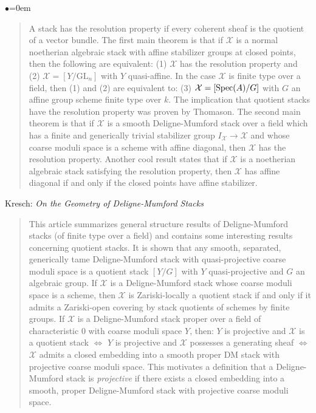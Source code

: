 \begin{list}{$\bullet$}{\leftmargin=0em}
\begin{quote}
A stack has the resolution property if every coherent sheaf is the quotient of 
a vector bundle. The first main theorem is that if $\mathcal{X}$ is a normal 
noetherian algebraic stack with affine stabilizer groups at closed points, then 
the following are equivalent: (1) $\mathcal{X}$ has the resolution property and 
(2) 
$\mathcal{X} = [Y/\text{GL}_n]$ with $Y$ quasi-affine. In the case 
$\mathcal{X}$ is finite type over 
a field, then (1) and (2) are equivalent to: (3)
$\mathcal{X} = [\mathop{\rm Spec}(A)/G]$ with $G$
an affine group scheme finite type over $k$. The implication that quotient 
stacks have the resolution property was proven by Thomason.
The second main theorem is that if $\mathcal{X}$ is a smooth Deligne-Mumford 
stack over 
a field which has a finite and generically trivial stabilizer group 
$I_\mathcal{X} 
\to \mathcal{X}$ and whose coarse moduli space is a scheme with affine 
diagonal, then 
$\mathcal{X}$ has the resolution property. Another cool result states that if 
$\mathcal{X}$ is 
a noetherian algebraic stack satisfying the resolution property, then 
$\mathcal{X}$ has 
affine diagonal if and only if the closed points have affine stabilizer. 
\end{quote}
\smallskip
\item Kresch: \emph{On the Geometry of Deligne-Mumford Stacks} 
\cite{kresch_geometry}
\begin{quote}
This article summarizes general structure results of Deligne-Mumford 
stacks (of finite type over a field) and contains some interesting results 
concerning quotient stacks. It is shown that any smooth, separated, 
generically tame Deligne-Mumford stack with quasi-projective coarse moduli 
space is a quotient stack $[Y/G]$ with $Y$ quasi-projective and $G$ an 
algebraic group. If $\mathcal{X}$ is a Deligne-Mumford stack whose coarse 
moduli space 
is a scheme, then $\mathcal{X}$ is Zariski-locally a quotient stack if and only 
if it 
admits a Zariski-open covering by stack quotients of schemes by finite groups.
If $\mathcal{X}$ is a Deligne-Mumford stack proper over a field of 
characteristic 0 
with coarse moduli space $Y$, then: $Y$ is projective and $\mathcal{X}$ is a 
quotient 
stack $\iff$ $Y$ is projective and $\mathcal{X}$ possesses a generating sheaf 
$\iff$ 
$\mathcal{X}$ admits a closed embedding into a smooth proper DM stack with 
projective 
coarse moduli space. This motivates a definition that a Deligne-Mumford stack 
is \emph{projective} if there exists a closed embedding into a smooth, proper 
Deligne-Mumford stack with projective coarse moduli space.

\end{quote}
\end{list}
